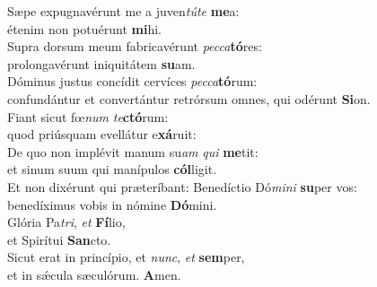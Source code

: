 \evenverse Sæpe expugnavérunt me a juven\textit{tú}\textit{te} \textbf{me}a:~\*\\
\evenverse étenim non potuérunt \textbf{mi}hi.\\
\oddverse Supra dorsum meum fabricavérunt \textit{pec}\textit{ca}\textbf{tó}res:~\*\\
\oddverse prolongavérunt iniquitátem \textbf{su}am.\\
\evenverse Dóminus justus concídit cervíces \textit{pec}\textit{ca}\textbf{tó}rum:~\*\\
\evenverse confundántur et convertántur retrórsum omnes, qui odérunt \textbf{Si}on.\\
\oddverse Fiant sicut fœ\textit{num} \textit{te}\textbf{ctó}rum:~\*\\
\oddverse quod priúsquam evellátur e\textbf{xá}ruit:\\
\evenverse De quo non implévit manum su\textit{am} \textit{qui} \textbf{me}tit:~\*\\
\evenverse et sinum suum qui manípulos \textbf{cól}ligit.\\
\oddverse Et non dixérunt qui præteríbant: Benedíctio Dó\textit{mi}\textit{ni} \textbf{su}per vos:~\*\\
\oddverse benedíximus vobis in nómine \textbf{Dó}mini.\\
\evenverse Glória Pa\textit{tri}, \textit{et} \textbf{Fí}lio,~\*\\
\evenverse et Spirítui \textbf{San}cto.\\
\oddverse Sicut erat in princípio, et \textit{nunc}, \textit{et} \textbf{sem}per,~\*\\
\oddverse et in sǽcula sæculórum. \textbf{A}men.\\
